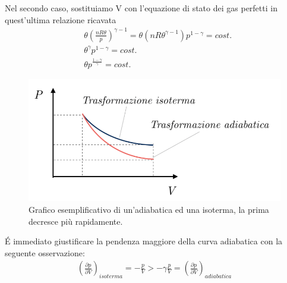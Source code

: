 \documentclass[10pt,a4paper]{article}
\begin{document}
Nel secondo caso, sostituiamo V con l'equazione di stato dei gas perfetti in quest'ultima relazione ricavata
\begin{align}\label{eq:adiabatica3}
	&\theta \left(\frac{n R \theta}{p} \right)^{\gamma-1}= \theta (n R \theta^{\gamma-1}) p^{1-\gamma}= cost.\nonumber\\
	&\theta^{\gamma} p^{1-\gamma}= cost.\nonumber\\
	&\theta p^{\frac{1-\gamma}{\gamma}} = cost.
\end{align}
\begin{figure}[h!]
	\centering
	\includegraphics[width=0.6\linewidth]{../images/adiabatica_grafico}
	\caption{Grafico esemplificativo di un'adiabatica ed una isoterma, la prima decresce più rapidamente.}
	\label{fig:adiabaticagrafico}
\end{figure}
\FloatBarrier
\'{E} immediato giustificare la pendenza maggiore della curva adiabatica con la seguente osservazione:
\begin{align*}
	\left(\frac{\partial p}{\partial V}\right)_{isoterma} = -\frac{p}{V} > -\gamma \frac{p}{V} = \left(\frac{\partial p}{\partial V}\right)_{adiabatica}
\end{align*}
\end{document}
